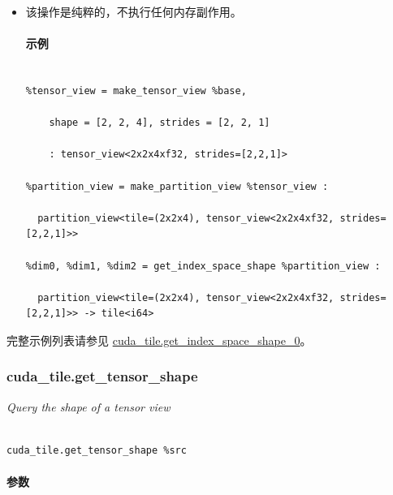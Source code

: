 \documentclass{article}
\begin{document}
\begin{itemize}
\item 该操作是纯粹的，不执行任何内存副作用。




\paragraph{示例}


\begin{lstlisting}

%tensor_view = make_tensor_view %base,

    shape = [2, 2, 4], strides = [2, 2, 1]

    : tensor_view<2x2x4xf32, strides=[2,2,1]>

%partition_view = make_partition_view %tensor_view :

  partition_view<tile=(2x2x4), tensor_view<2x2x4xf32, strides=[2,2,1]>>

%dim0, %dim1, %dim2 = get_index_space_shape %partition_view :

  partition_view<tile=(2x2x4), tensor_view<2x2x4xf32, strides=[2,2,1]>> -> tile<i64>

\end{lstlisting}



\end{itemize}
完整示例列表请参见 \href{https://docs.nvidia.com/cuda/tile-ir/latest/sections/appendix.html#example-cuda-tile-get-index-space-shape-0}{cuda\_tile.get\_index\_space\_shape\_0}。





\subsubsection{cuda\_tile.get\_tensor\_shape}


\textit{Query the shape of a tensor view}




\begin{lstlisting}

cuda_tile.get_tensor_shape %src

\end{lstlisting}



\paragraph{参数}
\end{document}
